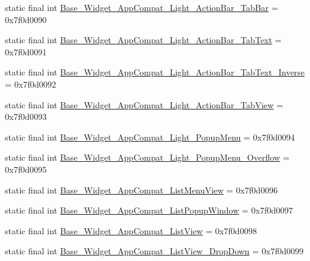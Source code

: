 \begin{DoxyCompactItemize}
\item 
static final int \mbox{\hyperlink{classandroid_1_1support_1_1design_1_1R_1_1style_a220f9db69bc055885e7b9434ac9c5abe}{Base\+\_\+\+Widget\+\_\+\+App\+Compat\+\_\+\+Light\+\_\+\+Action\+Bar\+\_\+\+Tab\+Bar}} = 0x7f0d0090
\item 
static final int \mbox{\hyperlink{classandroid_1_1support_1_1design_1_1R_1_1style_adc7f1b36997f04d77852dd8510e6e408}{Base\+\_\+\+Widget\+\_\+\+App\+Compat\+\_\+\+Light\+\_\+\+Action\+Bar\+\_\+\+Tab\+Text}} = 0x7f0d0091
\item 
static final int \mbox{\hyperlink{classandroid_1_1support_1_1design_1_1R_1_1style_a30acc6e75adeb415d02ac0eaf0fe96e3}{Base\+\_\+\+Widget\+\_\+\+App\+Compat\+\_\+\+Light\+\_\+\+Action\+Bar\+\_\+\+Tab\+Text\+\_\+\+Inverse}} = 0x7f0d0092
\item 
static final int \mbox{\hyperlink{classandroid_1_1support_1_1design_1_1R_1_1style_a60c463b25e5453155c43096e82d13589}{Base\+\_\+\+Widget\+\_\+\+App\+Compat\+\_\+\+Light\+\_\+\+Action\+Bar\+\_\+\+Tab\+View}} = 0x7f0d0093
\item 
static final int \mbox{\hyperlink{classandroid_1_1support_1_1design_1_1R_1_1style_ae0baa30f59ccb138bfa0ee415debbda1}{Base\+\_\+\+Widget\+\_\+\+App\+Compat\+\_\+\+Light\+\_\+\+Popup\+Menu}} = 0x7f0d0094
\item 
static final int \mbox{\hyperlink{classandroid_1_1support_1_1design_1_1R_1_1style_a61dcec87d76d5157b1216334f872be9d}{Base\+\_\+\+Widget\+\_\+\+App\+Compat\+\_\+\+Light\+\_\+\+Popup\+Menu\+\_\+\+Overflow}} = 0x7f0d0095
\item 
static final int \mbox{\hyperlink{classandroid_1_1support_1_1design_1_1R_1_1style_a2902d79a90d846a65ebb595b4c30190a}{Base\+\_\+\+Widget\+\_\+\+App\+Compat\+\_\+\+List\+Menu\+View}} = 0x7f0d0096
\item 
static final int \mbox{\hyperlink{classandroid_1_1support_1_1design_1_1R_1_1style_ad4b9f20b573cf189591167405c8d246d}{Base\+\_\+\+Widget\+\_\+\+App\+Compat\+\_\+\+List\+Popup\+Window}} = 0x7f0d0097
\item 
static final int \mbox{\hyperlink{classandroid_1_1support_1_1design_1_1R_1_1style_a13de35b0cfc641359585568fe72994fc}{Base\+\_\+\+Widget\+\_\+\+App\+Compat\+\_\+\+List\+View}} = 0x7f0d0098
\item 
static final int \mbox{\hyperlink{classandroid_1_1support_1_1design_1_1R_1_1style_aa4d2f59a86c267ef24a3fb00d578f3ee}{Base\+\_\+\+Widget\+\_\+\+App\+Compat\+\_\+\+List\+View\+\_\+\+Drop\+Down}} = 0x7f0d0099
\item 

\end{DoxyCompactItemize}
